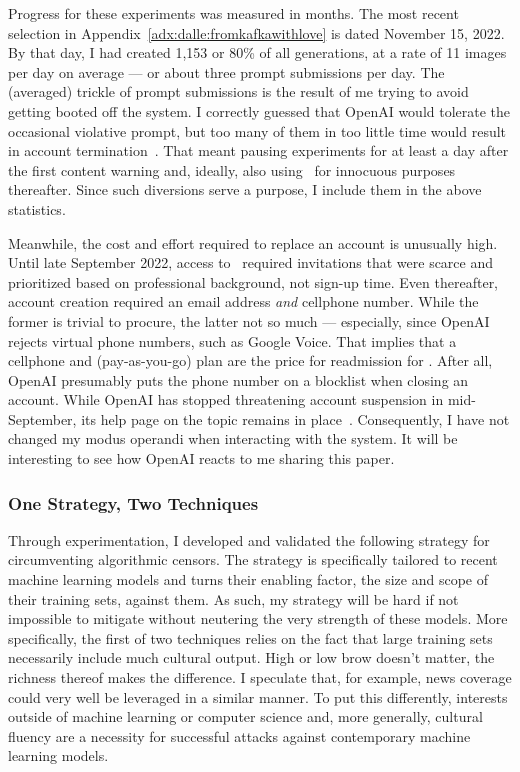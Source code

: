 Progress for these experiments was measured in months. The most recent selection
in Appendix~\ref{adx:dalle:fromkafkawithlove} is dated November 15, 2022. By
that day, I had created 1,153 or 80\% of all generations, at a rate of 11 images
per day on average --- or about three prompt submissions per day. The (averaged)
trickle of prompt submissions is the result of me trying to avoid getting booted
off the system. I correctly guessed that OpenAI would tolerate the occasional
violative prompt, but too many of them in too little time would result in
account termination~\cite{SpicyElephant2022}. That meant pausing experiments for
at least a day after the first content warning and, ideally, also using \DALLE\
for innocuous purposes thereafter. Since such diversions serve a purpose, I
include them in the above statistics.

Meanwhile, the cost and effort required to replace an account is unusually high.
Until late September 2022, access to \DALLE\ required invitations that were
scarce and prioritized based on professional background, not sign-up time. Even
thereafter, account creation required an email address \emph{and} cellphone
number. While the former is trivial to procure, the latter not so much ---
especially, since OpenAI rejects virtual phone numbers, such as Google Voice.
That implies that a cellphone and (pay-as-you-go) plan are the price for
readmission for \DALLE. After all, OpenAI presumably puts the phone number on a
blocklist when closing an account. While OpenAI has stopped threatening account
suspension in mid-September, its help page on the topic remains in
place~\cite{Natalie2022}. Consequently, I have not changed my modus operandi
when interacting with the system. It will be interesting to see how OpenAI
reacts to me sharing this paper.


\subsubsection{One Strategy, Two Techniques}

Through experimentation, I developed and validated the following strategy for
circumventing algorithmic censors. The strategy is specifically tailored to
recent machine learning models and turns their enabling factor, the size and
scope of their training sets, against them. As such, my strategy will be hard if
not impossible to mitigate without neutering the very strength of these models.
More specifically, the first of two techniques relies on the fact that large
training sets necessarily include much cultural output. High or low brow doesn't
matter, the richness thereof makes the difference. I speculate that, for
example, news coverage could very well be leveraged in a similar manner. To put
this differently, interests outside of machine learning or computer science and,
more generally, cultural fluency are a necessity for successful attacks against
contemporary machine learning models.

